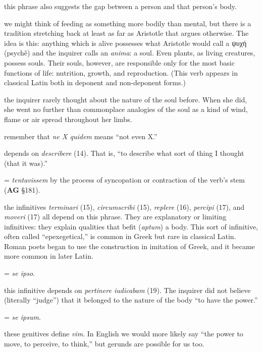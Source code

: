  this phrase also suggests the gap between a person and that person's body.

 we might think of feeding as something more bodily than mental, but there is a tradition stretching back at least as far as Aristotle that argues otherwise. The idea is this: anything which is alive possesses what Aristotle would call a \textgreek{ψυχή} (psychê) and the inquirer calls an \textit{anima}: a soul. Even plants, as living creatures, possess souls. Their souls, however, are responsible only for the most basic functions of life: nutrition, growth, and reproduction. (This verb appears in classical Latin both in deponent and non-deponent forms.)

 the inquirer rarely thought about the nature of the soul before. When she did, she went no further than commonplace analogies of the soul as a kind of wind, flame or air spread throughout her limbs.

 remember that \textit{ne X quidem} means ``not even X.''

 depends on \textit{describere} (14). That is, ``to describe what sort of thing I thought (that it was).''

 = \textit{tentavissem} by the process of syncopation or contraction of the verb's stem (\textbf{AG} §181).

 the infinitives \textit{terminari} (15), \textit{circumscribi} (15), \textit{replere} (16), \textit{percipi} (17), and \textit{moveri} (17) all depend on this phrase. They are explanatory or limiting infinitives: they explain qualities that befit (\textit{aptum}) a body. This sort of infinitive, often called ``epexegetical,'' is common in Greek but rare in classical Latin. Roman poets began to use the construction in imitation of Greek, and it became more common in later Latin.

 = \textit{se ipso}.

 this infinitive depends on \textit{pertinere iudicabam} (19). The inquirer did not believe (literally ``judge'') that it belonged to the nature of the body ``to have the power.''

 = \textit{se ipsum}.

 these genitives define \textit{vim}. In English we would more likely say ``the power to move, to perceive, to think,'' but gerunds are possible for us too.

